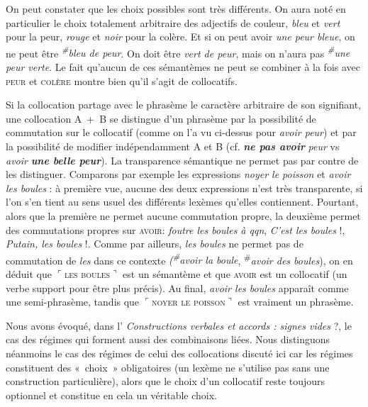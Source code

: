 On peut constater que les choix possibles sont très différents. On aura noté en particulier le choix totalement arbitraire des adjectifs de couleur, \textit{bleu} et \textit{vert} pour la peur, \textit{rouge} et \textit{noir} pour la colère. Et si on peut avoir \textit{une peur bleue}, on ne peut être \textit{\textsuperscript{\#}}\textit{bleu de peur}. On doit être \textit{vert de peur}, mais on n’aura pas \textit{\textsuperscript{\#}}\textit{une peur verte}. Le fait qu’aucun de ces sémantèmes ne peut se combiner à la fois avec \textsc{peur} et \textsc{colère} montre bien qu’il s’agit de collocatifs.

Si la collocation partage avec le phrasème le caractère arbitraire de son signifiant, une collocation A~+~B se distingue d’un phrasème par la possibilité de commutation sur le collocatif (comme on l’a vu ci-dessus pour \textit{avoir peur}) et par la possibilité de modifier indépendamment A et B (cf. \textbf{\textit{ne pas avoir}} \textit{peur} vs \textit{avoir} \textbf{\textit{une belle peur}}). La transparence sémantique ne permet pas par contre de les distinguer. Comparons par exemple les expressions \textit{noyer le poisson} et \textit{avoir les boules} : à première vue, aucune des deux expressions n’est très transparente, si l’on s’en tient au sens usuel des différents lexèmes qu’elles contiennent. Pourtant, alors que la première ne permet aucune commutation propre, la deuxième permet des commutations propres sur \textsc{avoir}: \textit{foutre les boules à qqn}, \textit{C’est les boules} !, \textit{Putain, les boules} !. Comme par ailleurs, \textit{les boules} ne permet pas de commutation de \textit{les} dans ce contexte \textit{(\textsuperscript{\#}}\textit{avoir la boule}, \textsuperscript{\#}\textit{avoir des boules}), on en déduit que $⌜$\textsc{les} \textsc{boules}$⌝$ est un sémantème et que \textsc{avoir} est un collocatif (un verbe support pour être plus précis). Au final, \textit{avoir les boules} apparaît comme une semi-phrasème, tandis que $⌜$\textsc{noyer} \textsc{le} \textsc{poisson}$⌝$ est vraiment un phrasème.

Nous avons évoqué, dans l’ \textit{Constructions verbales et accords : signes vides} ?, le cas des régimes qui forment aussi des combinaisons liées. Nous distinguons néanmoins le cas des régimes de celui des collocations discuté ici car les régimes constituent des «~choix~» obligatoires (un lexème ne s’utilise pas sans une construction particulière), alors que le choix d’un collocatif reste toujours optionnel et constitue en cela un véritable choix.

